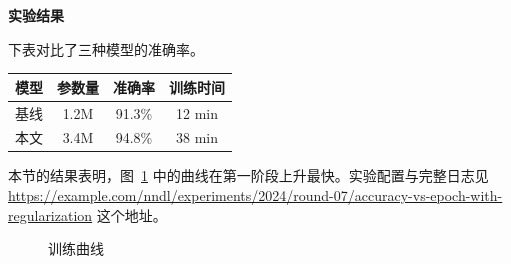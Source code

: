 \documentclass[UTF8,11pt]{ctexart}
\begin{document}
\begin{center}
{\LARGE\bfseries 实验结果}
\end{center}

\vspace{10pt}
下表对比了三种模型的准确率。

\begin{center}
\begin{tabular}{lccc}
\toprule
模型 & 参数量 & 准确率 & 训练时间 \\
\midrule
基线 & 1.2M & 91.3\% & 12 min \\
本文 & 3.4M & 94.8\% & 38 min \\
\bottomrule
\end{tabular}
\end{center}

本节的结果表明，图~\ref{fig:curve} 中的曲线在第一阶段上升最快。实验配置与完整日志见 \url{https://example.com/nndl/experiments/2024/round-07/accuracy-vs-epoch-with-regularization} 这个地址。

\begin{figure}[htbp]
\centering
{}\caption{训练曲线}\label{fig:curve}
\end{figure}
\end{document}
